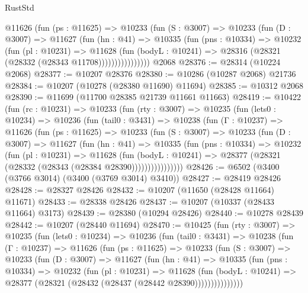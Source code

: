 \begin{lexlean}{RustStd}
\begin{coremodule}
              @11626
                (fun (ps : @11625) =>
                @10233
                  (fun (S : @3007) =>
                  @10233
                    (fun (D : @3007) =>
                    @11627
                      (fun (hn : @41) =>
                      @10335
                        (fun (pns : @10334) =>
                        @10232
                          (fun (pl : @10231) =>
                          @11628
                            (fun (bodyL : @10241) =>
                            @28316 (@28321 (@28332 (@28343 @11708))))))))))))))))
    @2068
@28376 := @28314 (@10224 @2068)
@28377 := @10207 @28376
@28380 := @10286 (@10287 @2068) @21736
@28384 := @10207 (@10278 (@28380 @11690) @11694)
@28385 := @10312 @2068
@28390 := @11699 (@11700 @28385 @21739 @11661 @11663)
@28419 := @10422
    (fun (rc : @10231) =>
    @10233
      (fun (rty : @3007) =>
      @10235
        (fun (lets0 : @10234) =>
        @10236
          (fun (tail0 : @3431) =>
          @10238
            (fun (Γ : @10237) =>
            @11626
              (fun (ps : @11625) =>
              @10233
                (fun (S : @3007) =>
                @10233
                  (fun (D : @3007) =>
                  @11627
                    (fun (hn : @41) =>
                    @10335
                      (fun (pns : @10334) =>
                      @10232
                        (fun (pl : @10231) =>
                        @11628
                          (fun (bodyL : @10241) =>
                          @28377 (@28321 (@28332 (@28343 (@28384 @28390))))))))))))))))
@28426 := @6502 (@3400 (@3766 @3014) (@3400 (@3769 @3014) @3410))
@28427 := @28419 @28426
@28428 := @28327 @28426
@28432 := @10207 (@11650 (@28428 @11664) @11671)
@28433 := @28338 @28426
@28437 := @10207 (@10337 (@28433 @11664) @3173)
@28439 := @28380 (@10294 @28426)
@28440 := @10278 @28439
@28442 := @10207 (@28440 @11694)
@28470 := @10425
    (fun (rty : @3007) =>
    @10235
      (fun (lets0 : @10234) =>
      @10236
        (fun (tail0 : @3431) =>
        @10238
          (fun (Γ : @10237) =>
          @11626
            (fun (ps : @11625) =>
            @10233
              (fun (S : @3007) =>
              @10233
                (fun (D : @3007) =>
                @11627
                  (fun (hn : @41) =>
                  @10335
                    (fun (pns : @10334) =>
                    @10232
                      (fun (pl : @10231) =>
                      @11628
                        (fun (bodyL : @10241) =>
                        @28377 (@28321 (@28432 (@28437 (@28442 @28390)))))))))))))))

\end{coremodule}
\end{lexlean}
